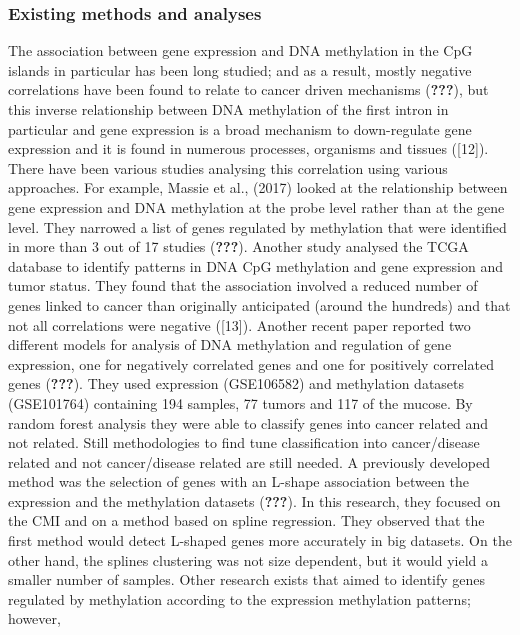 \documentclass[10pt,letterpaper]{article}
\begin{document}
\hypertarget{existing-methods-and-analyses}{%
\subsubsection{Existing methods and
analyses}\label{existing-methods-and-analyses}}

The association between gene expression and DNA methylation in the CpG
islands in particular has been long studied; and as a result, mostly
negative correlations have been found to relate to cancer driven
mechanisms (\textbf{???}), but this inverse relationship between DNA
methylation of the first intron in particular and gene expression is a
broad mechanism to down-regulate gene expression and it is found in
numerous processes, organisms and tissues ({[}12{]}). There have been
various studies analysing this correlation using various approaches. For
example, Massie et al., (2017) looked at the relationship between gene
expression and DNA methylation at the probe level rather than at the
gene level. They narrowed a list of genes regulated by methylation that
were identified in more than 3 out of 17 studies (\textbf{???}). Another
study analysed the TCGA database to identify patterns in DNA CpG
methylation and gene expression and tumor status. They found that the
association involved a reduced number of genes linked to cancer than
originally anticipated (around the hundreds) and that not all
correlations were negative ({[}13{]}). Another recent paper reported two
different models for analysis of DNA methylation and regulation of gene
expression, one for negatively correlated genes and one for positively
correlated genes (\textbf{???}). They used expression (GSE106582) and
methylation datasets (GSE101764) containing 194 samples, 77 tumors and
117 of the mucose. By random forest analysis they were able to classify
genes into cancer related and not related. Still methodologies to find
tune classification into cancer/disease related and not cancer/disease
related are still needed. A previously developed method was the
selection of genes with an L-shape association between the expression
and the methylation datasets (\textbf{???}). In this research, they
focused on the CMI and on a method based on spline regression. They
observed that the first method would detect L-shaped genes more
accurately in big datasets. On the other hand, the splines clustering
was not size dependent, but it would yield a smaller number of samples.
Other research exists that aimed to identify genes regulated by
methylation according to the expression methylation patterns; however,
\end{document}
